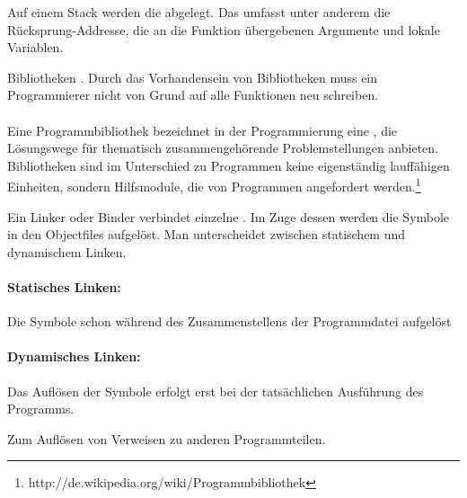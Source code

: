 \begin{answer}
  Auf einem Stack werden die  abgelegt. Das umfasst unter anderem die Rücksprung-Addresse, die an die Funktion übergebenen Argumente und lokale Variablen.
\end{answer}

\begin{answer}
  Bibliotheken . Durch das Vorhandensein von Bibliotheken muss ein Programmierer nicht von Grund auf alle Funktionen neu schreiben.

  \paragraph{}
  Eine Programmbibliothek bezeichnet in der Programmierung eine , die Lösungswege für thematisch zusammengehörende Problemstellungen anbieten. Bibliotheken sind im Unterschied zu Programmen keine eigenständig lauffähigen Einheiten, sondern Hilfsmodule, die von Programmen angefordert werden.\footnote{http://de.wikipedia.org/wiki/Programmbibliothek}

\end{answer}

\begin{answer}
  Ein Linker oder Binder verbindet einzelne . Im Zuge dessen werden die Symbole in den Objectfiles aufgelöst. Man unterscheidet zwischen statischem und dynamischem Linken.

  \paragraph*{Statisches Linken:}
  Die Symbole schon während des Zusammenstellens der Programmdatei aufgelöst

  \paragraph*{Dynamisches Linken:}
  Das Auflösen der Symbole erfolgt erst bei der tatsächlichen Ausführung des Programms.
\end{answer}

\begin{answer}
  Zum Auflösen von Verweisen zu anderen Programmteilen.
\end{answer}

